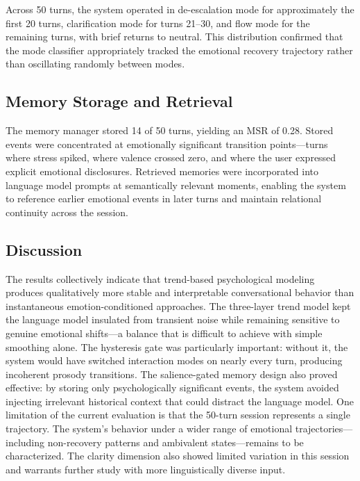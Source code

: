 \documentclass[conference]{IEEEtran}
\begin{document}
Across 50 turns, the system operated in de-escalation mode for approximately the first 20 turns, clarification mode for turns 21--30, and flow mode for the remaining turns, with brief returns to neutral. This distribution confirmed that the mode classifier appropriately tracked the emotional recovery trajectory rather than oscillating randomly between modes.

\subsection{Memory Storage and Retrieval}

The memory manager stored 14 of 50 turns, yielding an MSR of 0.28. Stored events were concentrated at emotionally significant transition points---turns where stress spiked, where valence crossed zero, and where the user expressed explicit emotional disclosures. Retrieved memories were incorporated into language model prompts at semantically relevant moments, enabling the system to reference earlier emotional events in later turns and maintain relational continuity across the session.

\subsection{Discussion}

The results collectively indicate that trend-based psychological modeling produces qualitatively more stable and interpretable conversational behavior than instantaneous emotion-conditioned approaches. The three-layer trend model kept the language model insulated from transient noise while remaining sensitive to genuine emotional shifts---a balance that is difficult to achieve with simple smoothing alone. The hysteresis gate was particularly important: without it, the system would have switched interaction modes on nearly every turn, producing incoherent prosody transitions. The salience-gated memory design also proved effective: by storing only psychologically significant events, the system avoided injecting irrelevant historical context that could distract the language model. One limitation of the current evaluation is that the 50-turn session represents a single trajectory. The system's behavior under a wider range of emotional trajectories---including non-recovery patterns and ambivalent states---remains to be characterized. The clarity dimension also showed limited variation in this session and warrants further study with more linguistically diverse input.
\end{document}
